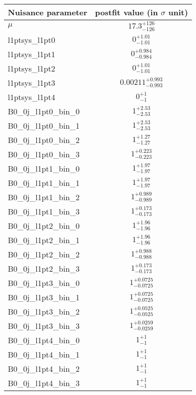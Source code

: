 
\begin{tabular}{|l|c|}
\hline
Nuisance parameter & postfit value (in $\sigma$ unit) \\\hline
$\mu$ & $17.3^{+126}_{-126}$ \\
l1ptsys\_l1pt0 & $0^{+1.01}_{-1.01}$ \\
l1ptsys\_l1pt1 & $0^{+0.984}_{-0.984}$ \\
l1ptsys\_l1pt2 & $0^{+1.01}_{-1.01}$ \\
l1ptsys\_l1pt3 & $0.00211^{+0.993}_{-0.993}$ \\
l1ptsys\_l1pt4 & $0^{+1}_{-1}$ \\
B0\_0j\_l1pt0\_bin\_0 & $1^{+2.53}_{-2.53}$ \\
B0\_0j\_l1pt0\_bin\_1 & $1^{+2.53}_{-2.53}$ \\
B0\_0j\_l1pt0\_bin\_2 & $1^{+1.27}_{-1.27}$ \\
B0\_0j\_l1pt0\_bin\_3 & $1^{+0.223}_{-0.223}$ \\
B0\_0j\_l1pt1\_bin\_0 & $1^{+1.97}_{-1.97}$ \\
B0\_0j\_l1pt1\_bin\_1 & $1^{+1.97}_{-1.97}$ \\
B0\_0j\_l1pt1\_bin\_2 & $1^{+0.989}_{-0.989}$ \\
B0\_0j\_l1pt1\_bin\_3 & $1^{+0.173}_{-0.173}$ \\
B0\_0j\_l1pt2\_bin\_0 & $1^{+1.96}_{-1.96}$ \\
B0\_0j\_l1pt2\_bin\_1 & $1^{+1.96}_{-1.96}$ \\
B0\_0j\_l1pt2\_bin\_2 & $1^{+0.988}_{-0.988}$ \\
B0\_0j\_l1pt2\_bin\_3 & $1^{+0.173}_{-0.173}$ \\
B0\_0j\_l1pt3\_bin\_0 & $1^{+0.0725}_{-0.0725}$ \\
B0\_0j\_l1pt3\_bin\_1 & $1^{+0.0725}_{-0.0725}$ \\
B0\_0j\_l1pt3\_bin\_2 & $1^{+0.0525}_{-0.0525}$ \\
B0\_0j\_l1pt3\_bin\_3 & $1^{+0.0259}_{-0.0259}$ \\
B0\_0j\_l1pt4\_bin\_0 & $1^{+1}_{-1}$ \\
B0\_0j\_l1pt4\_bin\_1 & $1^{+1}_{-1}$ \\
B0\_0j\_l1pt4\_bin\_2 & $1^{+1}_{-1}$ \\
B0\_0j\_l1pt4\_bin\_3 & $1^{+1}_{-1}$ \\
\hline
\end{tabular}
